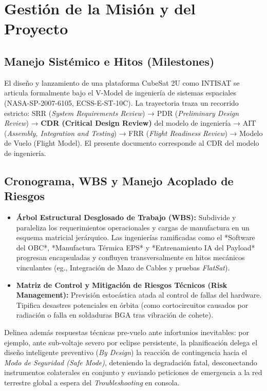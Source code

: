 \chapter{Gestión de la Misión y del Proyecto}

\section{Manejo Sistémico e Hitos (Milestones)}
El diseño y lanzamiento de una plataforma CubeSat 2U como INTISAT se articula formalmente bajo el V-Model de ingeniería de sistemas espaciales (NASA-SP-2007-6105, ECSS-E-ST-10C). La trayectoria traza un recorrido estricto: SRR (\textit{System Requirements Review}) → PDR (\textit{Preliminary Design Review}) → \textbf{CDR (Critical Design Review)} del modelo de ingeniería → AIT (\textit{Assembly, Integration and Testing}) → FRR (\textit{Flight Readiness Review}) → Modelo de Vuelo (Flight Model). El presente documento corresponde al CDR del modelo de ingeniería.

\section{Cronograma, WBS y Manejo Acoplado de Riesgos}
\begin{itemize}
    \item \textbf{Árbol Estructural Desglosado de Trabajo (WBS):} Subdivide y paraleliza los requerimientos operacionales y cargas de manufactura en un esquema matricial jerárquico. Las ingenierías ramificadas como el *Software del OBC*, *Manufactura Térmica EPS* y *Entrenamiento IA del Payload* progresan encapsuladas y confluyen transversalmente en hitos mecánicos vinculantes (eg., Integración de Mazo de Cables y pruebas \textit{FlatSat}).
    
    \item \textbf{Matriz de Control y Mitigación de Riesgos Técnicos (Risk Management):} Previsión estocástica atada al control de fallas del hardware. Tipifica desastres potenciales en órbita (como cortocircuitos causados por radiación o falla en soldaduras BGA tras vibración de cohete). 
\end{itemize}

Delinea además respuestas técnicas pre-vuelo ante infortunios inevitables: por ejemplo, ante sub-voltaje severo por eclipse persistente, la planificación delega el diseño inteligente preventivo (\textit{By Design}) la reacción de contingencia hacia el \textit{Modo de Seguridad (Safe Mode)}, deteniendo la degradación fatal, desconectando instrumentos colaterales en conjunto y enviando peticiones de emergencia a la red terrestre global a espera del \textit{Troubleshooting} en consola.

